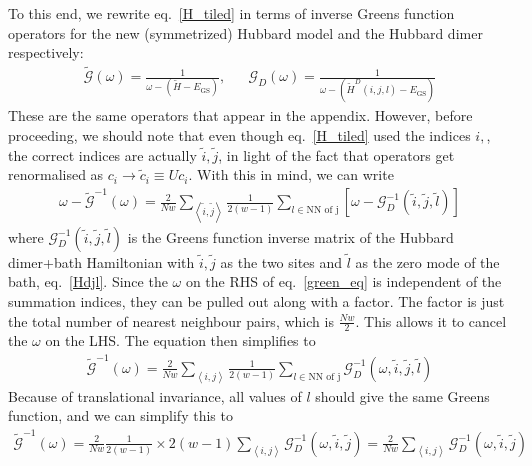 \documentclass{report}
\numberwithin{equation}{section}
\begin{document}
To this end, we rewrite eq.~\ref{H_tiled} in terms of inverse Greens function operators for the new (symmetrized) Hubbard model and the Hubbard dimer respectively:
\begin{equation}\begin{aligned}
	\label{Gd_op}
	\mathcal{\tilde G}(\omega) = \frac{1}{\omega - \left(\tilde H - E_\text{GS}\right)}, && \mathcal{G}_D(\omega) = \frac{1}{\omega - \left(\tilde H^D(i,j,l) - E_\text{GS}\right)}
\end{aligned}\end{equation}
These are the same operators that appear in the appendix. However, before proceeding, we should note that even though eq.~\ref{H_tiled} used the indices $i,$, the correct indices are actually $\tilde i, \tilde j$, in light of the fact that operators get renormalised as $c_i \to \tilde c_i\equiv Uc_i$. With this in mind, we can write
\begin{equation}\begin{aligned}
	\label{green_eq}
	\omega - \mathcal{\tilde G}^{-1}(\omega) = \frac{2}{Nw}\sum_{\left<\tilde i, \tilde j\right>} \frac{1}{2(w-1)} \sum_{l \in \text{NN of j}}\left[\omega - \mathcal{G}_D^{-1}\left(\tilde i, \tilde j, \tilde l\right)\right]
\end{aligned}\end{equation}
where $\mathcal{G}_D^{-1}(\tilde i,\tilde j, \tilde l)$ is the Greens function inverse matrix of the Hubbard dimer+bath Hamiltonian with $\tilde i, \tilde j$ as the two sites and \(\tilde l\) as the zero mode of the bath, eq.~\ref{Hdjl}. Since the $\omega$ on the RHS of eq.~\ref{green_eq} is independent of the summation indices, they can be pulled out along with a factor. The factor is just the total number of nearest neighbour pairs, which is $\frac{Nw}{2}$. This allows it to cancel the $\omega$ on the LHS. The equation then simplifies to
\begin{equation}\begin{aligned}
	\mathcal{\tilde G}^{-1}(\omega) = \frac{2}{Nw}\sum_{\left<i,j\right>}\frac{1}{2(w-1)}\sum_{l \in \text{NN of j}}\mathcal{G}_D^{-1}\left(\omega, \tilde i, \tilde j, \tilde l\right)
\end{aligned}\end{equation}
Because of translational invariance, all values of \(l\) should give the same Greens function, and we can simplify this to
\begin{equation}\begin{aligned}
	\label{green_eq_final}
	\mathcal{\tilde G}^{-1}(\omega) = \frac{2}{Nw}\frac{1}{2(w-1)}\times 2(w-1)\sum_{\left<i,j\right>}\mathcal{G}_D^{-1}\left(\omega, \tilde i, \tilde j\right) = \frac{2}{Nw}\sum_{\left<i,j\right>}\mathcal{G}_D^{-1}\left(\omega, \tilde i, \tilde j\right)
\end{aligned}\end{equation}
\end{document}
